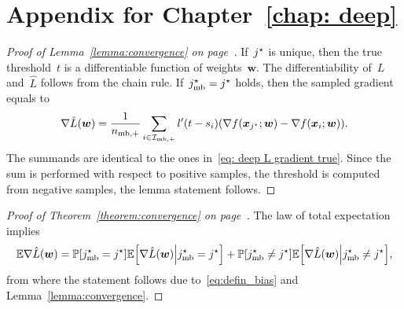 \chapter{Appendix for Chapter~\ref{chap: deep}}

\lemmacovergencedeep*
\begin{proof}[Proof of Lemma~\ref{lemma:convergence} on page~\pageref{lemma:convergence}]
  If~$j^{\star}$ is unique, then the true threshold~$t$ is a differentiable function of weights~$\bm{w}$. The differentiability of~$L$ and~$\hat{L}$ follows from the chain rule. If~$j^{\star}_{\text{mb}} = j^{\star}$ holds, then the sampled gradient equals to
  \begin{equation}\label{eq:grad_min_aux}
    \nabla \hat L(\bm{w})
      = \frac{1}{\nmbpos} \sum_{i\in \Imbpos} l'(t - s_i) \Brac{\nabla f(\bm{x}_{\indmax}; \bm{w}) - \nabla f(\bm{x}_i; \bm{w})}.
  \end{equation}
  The summands are identical to the ones in~\eqref{eq: deep L gradient true}. Since the sum is performed with respect to positive samples, the threshold is computed from negative samples, the lemma statement follows.
\end{proof}

\thmcovergencedeep*
\begin{proof}[Proof of Theorem~\ref{theorem:convergence} on page~\pageref{theorem:convergence}]
  The law of total expectation implies
  \begin{equation*}
    \EE \nabla \hat L(\bm{w})
      = \PP \Brac[s]{\indmaxmb = \indmax} \EE \Brac[s]{\nabla \hat L(\bm{w}) \middle\vert \indmaxmb =\indmax}
      + \PP \Brac[s]{\indmaxmb \neq \indmax} \EE \Brac[s]{\nabla \hat L(\bm{w}) \middle\vert\indmaxmb\neq \indmax},
  \end{equation*}
  from where the statement follows due to~\eqref{eq:defin_bias} and Lemma~\ref{lemma:convergence}.
\end{proof}
